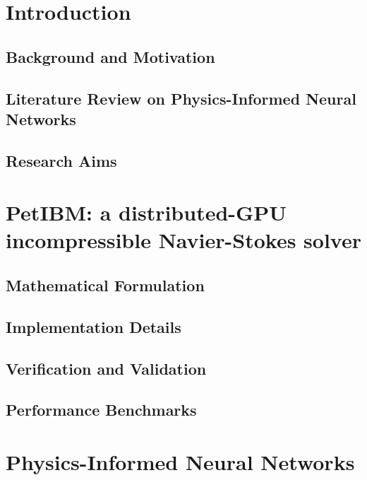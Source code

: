 \documentclass[font=Times]{gw-dissertation}[2021/11/19]
\begin{document}


\chapter{Introduction}

    \section{Background and Motivation}
    

    \section{Literature Review on Physics-Informed Neural Networks}
    

    \section{Research Aims}
    

\chapter{PetIBM: a distributed-GPU incompressible Navier-Stokes solver}


    \section{Mathematical Formulation}
    

    \section{Implementation Details}
    

    \section{Verification and Validation}

    \section{Performance Benchmarks}
    

\chapter{Physics-Informed Neural Networks}
\end{document}
